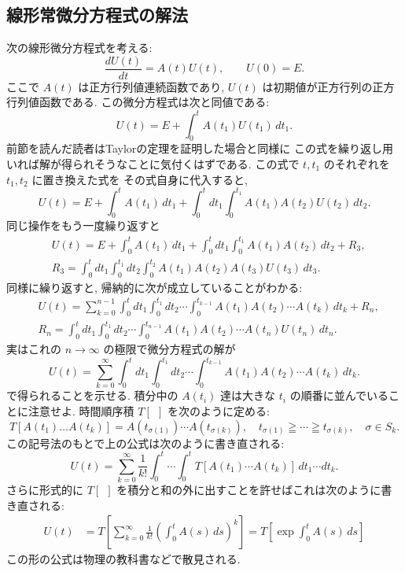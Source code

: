 \documentclass[12pt,twoside]{jarticle}
\theoremstyle{jplain}
\theoremstyle{jplain}
\theoremstyle{jplain}
\numberwithin{theorem}{section}
\numberwithin{equation}{section}
\numberwithin{figure}{section}
\numberwithin{table}{section}
\begin{document}

\subsection{線形常微分方程式の解法}
\label{sec:LODE}

次の線形微分方程式を考える:
\[
\frac{dU(t)}{dt} = A(t)U(t), \qquad U(0)=E.
\]
ここで $A(t)$ は正方行列値連続函数であり,
$U(t)$ は初期値が正方行列の正方行列値函数である.
この微分方程式は次と同値である:
\[
U(t) = E + \int_0^t A(t_1)U(t_1)\,dt_1.
\]
前節を読んだ読者はTaylorの定理を証明した場合と同様に
この式を繰り返し用いれば解が得られそうなことに気付くはずである.
この式で $t,t_1$ のそれぞれを $t_1,t_2$ に置き換えた式を
その式自身に代入すると,
\[
U(t)=E+\int_0^t A(t_1)\,dt_1 + \int_0^t\!\!\!dt_1\int_0^{t_1}A(t_1)A(t_2)U(t_2)\,dt_2.
\]
同じ操作をもう一度繰り返すと
\begin{align*}
&
U(t)=E+\int_0^t A(t_1)\,dt_1
+\int_0^t\!\!\!dt_1\int_0^{t_1} A(t_1)A(t_2)\,dt_2
+R_3,
\\ &
R_3 = \int_0^t\!\!\!dt_1\int_0^{t_1}\!\!\!dt_2\int_0^{t_2}A(t_1)A(t_2)A(t_3)U(t_3)\,dt_3.
\end{align*}
同様に繰り返すと, 帰納的に次が成立していることがわかる:
\begin{align*}
&
U(t)=\sum_{k=0}^{n-1}
\int_0^t\!\!\!dt_1\int_0^{t_1}\!\!\!dt_2\cdots\int_0^{t_{k-1}}
A(t_1)A(t_2)\cdots A(t_k)\,dt_k
+R_n,
\\ &
R_n=\int_0^t\!\!\!dt_1\int_0^{t_1}\!\!\!dt_2\cdots\int_0^{t_{n-1}}
A(t_1)A(t_2)\cdots A(t_n)U(t_n)\,dt_n.
\end{align*}
実はこれの $n\to\infty$ の極限で微分方程式の解が
\[
U(t)=\sum_{k=0}^\infty
\int_0^t\!\!\!dt_1\int_0^{t_1}\!\!\!dt_2\cdots\int_0^{t_{k-1}}
A(t_1)A(t_2)\cdots A(t_k)\,dt_k.
\]
で得られることを示せる.
積分中の $A(t_i)$ 達は大きな $t_i$ の順番に並んでいることに注意せよ.
時間順序積 $T[\ \ ]$ を次のように定める:
\[
T[A(t_1)\ldots A(t_k)]
= A(t_{\sigma(1)})\cdots A(t_{\sigma(k)}),
\quad
t_{\sigma(1)}\geqq\cdots\geqq t_{\sigma(k)},
\quad
\sigma\in S_k.
\]
この記号法のもとで上の公式は次のように書き直される:
\[
U(t)=\sum_{k=0}^\infty\frac{1}{k!}\int_0^t\cdots\int_0^t T[A(t_1)\cdots A(t_k)]\,dt_1\cdots dt_k.
\]
さらに形式的に $T[\ \ ]$ を積分と和の外に出すことを許せばこれは次のように書き直される:
\begin{align*}
U(t)
&=T\left[
\sum_{k=0}^\infty \frac{1}{k!}
\left(\int_0^t A(s)\,ds\right)^k
\right]
=T\left[\exp\int_0^t A(s)\,ds \right]
\end{align*}
この形の公式は物理の教科書などで散見される.
\end{document}
